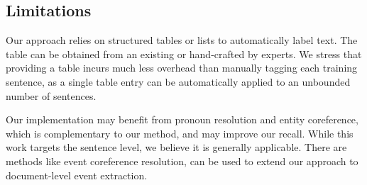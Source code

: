 %

\subsection{Limitations}
Our approach relies on structured tables or lists to automatically label text. The table can be obtained from an existing \KB or
hand-crafted by experts. We stress that providing a table incurs much less overhead than manually tagging each training sentence, as a
single table entry can be automatically applied to an unbounded number of sentences.



Our implementation may benefit from pronoun resolution  and entity coreference, %
which is complementary to our method, and may improve our recall.
While this work targets the sentence level, we believe it is generally applicable. There are methods like event coreference resolution\cite{liao2010using,berant2014modeling},  can be used to
extend our approach to document-level event extraction.
